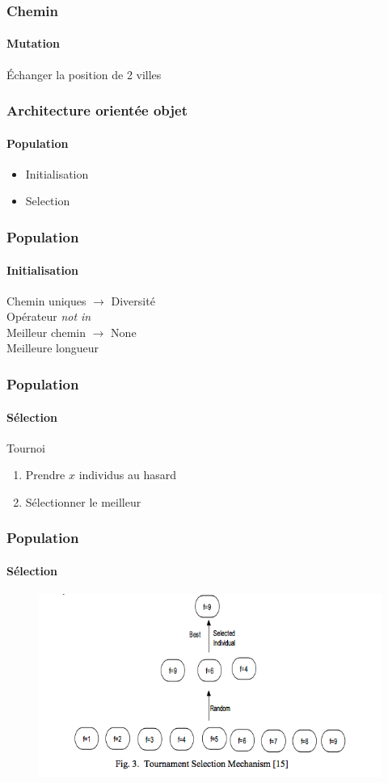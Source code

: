 \documentclass[16pt]{beamer}
\begin{document}
\begin{frame}
  \frametitle{Chemin}
  \framesubtitle{Mutation}
  Échanger la position de 2 villes
\end{frame}

\begin{frame}
  \frametitle{Architecture orientée objet}
  \framesubtitle{\textbf{Population}}
  \begin{itemize}
    \item Initialisation
    \item Selection
  \end{itemize}
\end{frame}

\begin{frame}
  \frametitle{Population}
  \framesubtitle{Initialisation}
  Chemin uniques $\rightarrow$ Diversité \\
  Opérateur \emph{not in} \\ \pause{}
  Meilleur chemin \pause{} $\rightarrow$ None\\ \pause{}
  Meilleure longueur \\
\end{frame}

\begin{frame}
  \frametitle{Population}
  \framesubtitle{Sélection}
  Tournoi
  \begin{enumerate}
    \item Prendre $x$ individus au hasard
    \item Sélectionner le meilleur 
  \end{enumerate}
\end{frame}

\begin{frame}
  \frametitle{Population}
  \framesubtitle{Sélection}
  \begin{figure}
    \includegraphics[scale=0.4]{tournament.png}
  \end{figure}
\end{frame}
\end{document}
